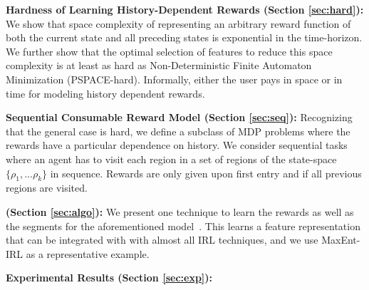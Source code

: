 \noindent\textbf{Hardness of Learning History-Dependent Rewards (Section \ref{sec:hard}): } We show that space complexity of representing an arbitrary reward function of both the current state and all preceding states is exponential in the time-horizon. We further show that the optimal selection of features to reduce this space complexity is at least as hard as Non-Deterministic Finite Automaton Minimization (PSPACE-hard). Informally, either the user pays in space or in time for modeling history dependent rewards.

\vspace{0.5em}

\noindent\textbf{Sequential Consumable Reward Model (Section \ref{sec:seq}): } Recognizing that the general case is hard, we define a subclass of MDP problems where the rewards have a particular dependence on history. We consider sequential tasks where an agent has to visit each region in a set of regions of the state-space $\{\rho_1,...\rho_k\}$ in sequence.
Rewards are only given upon first entry and if all previous regions are visited.

\vspace{0.5em}

\noindent\textbf{\tshfull  (Section \ref{sec:algo}): }
We present one technique to learn the rewards as well as the segments for the aforementioned model~\cite{krishnan2015tsc,murali2016}.
This learns a feature representation that can be integrated with with almost all IRL techniques, and we use MaxEnt-IRL as a representative example.

\vspace{0.5em}

\noindent\textbf{Experimental Results  (Section \ref{sec:exp}): }
\fi

